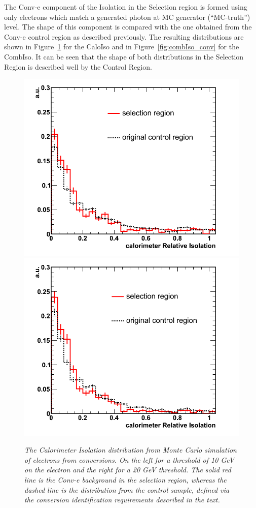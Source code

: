 The Conv-e component of the Isolation in the Selection region is formed using only electrons which match a generated photon at MC generator (``MC-truth'') level. The shape of this component is compared with the one obtained from the Conv-e control region as described previously.  The resulting distributions are shown in Figure~\ref{fig:caloIso_conv} for the CaloIso and in Figure~\ref{fig:combIso_conv} for the CombIso.  It can be seen that the shape of both distributions in the Selection Region is described well by the Control Region.

\begin{figure}[h!]
\centering
\includegraphics[scale=0.32]{Plots/caloIso_pt10_conv.png}
\includegraphics[scale=0.32]{Plots/caloIso_pt20_conv.png}
\caption{\textit{The Calorimeter Isolation distribution from Monte Carlo simulation of electrons from conversions.   On the left for a threshold of 10 GeV on the electron and the right for a 20 GeV threshold.  The solid red line is the Conv-e background in the selection region, whereas the dashed line is the distribution from the control sample, defined via the conversion identification requirements described in the text.}}\label{fig:caloIso_conv}
\end{figure}

